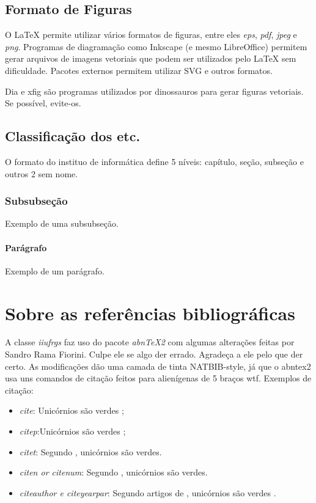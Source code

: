 \documentclass[cic,tc,english]{iiufrgs}
\begin{document}
\subsection{Formato de Figuras}
\label{sec:fig_format}

O LaTeX permite utilizar vários formatos de figuras, entre eles \emph{eps}, \emph{pdf}, \emph{jpeg} e \emph{png}. Programas de diagramação como Inkscape (e mesmo LibreOffice) permitem gerar arquivos de imagens vetoriais que podem ser utilizados pelo LaTeX sem dificuldade. Pacotes externos permitem utilizar SVG e outros formatos.

Dia e xfig são programas utilizados por dinossauros para gerar figuras vetoriais. Se possível, evite-os.

\subsection{Classificação dos etc.}

O formato do instituo de informática define 5 níveis: capítulo, seção, subseção e outros 2 sem nome.

\subsubsection{Subsubseção}
Exemplo de uma subsubseção.

\paragraph{Parágrafo}
Exemplo de um parágrafo.

\section{Sobre as referências bibliográficas}

A classe \emph{iiufrgs} faz uso do pacote \emph{abnTeX2} com algumas alterações
feitas por Sandro Rama Fiorini. Culpe ele se algo der errado. Agradeça a ele
pelo que der certo. As modificações dão uma camada de tinta NATBIB-style,
já que o abntex2 usa uns comandos de citação feitos para alienígenas de 5 braços
wtf. Exemplos de citação:

\begin{itemize}
    \item \emph{cite}: Unicórnios são verdes \cite{Adams2009Conceptual};
    \item \emph{citep}:Unicórnios são verdes \citep{Adams2009Conceptual};
    \item \emph{citet}: Segundo \citet{Adams2009Conceptual}, unicórnios são
    verdes.
    \item \emph{citen or citenum}: Segundo ,
    unicórnios são verdes.
    \item \emph{citeauthor e citeyearpar}: Segundo artigos de
    \citeauthor{Adams2009Conceptual} , unicórnios são verdes
    \citeyearpar{Adams2009Conceptual}.

\end{itemize}
\end{document}
